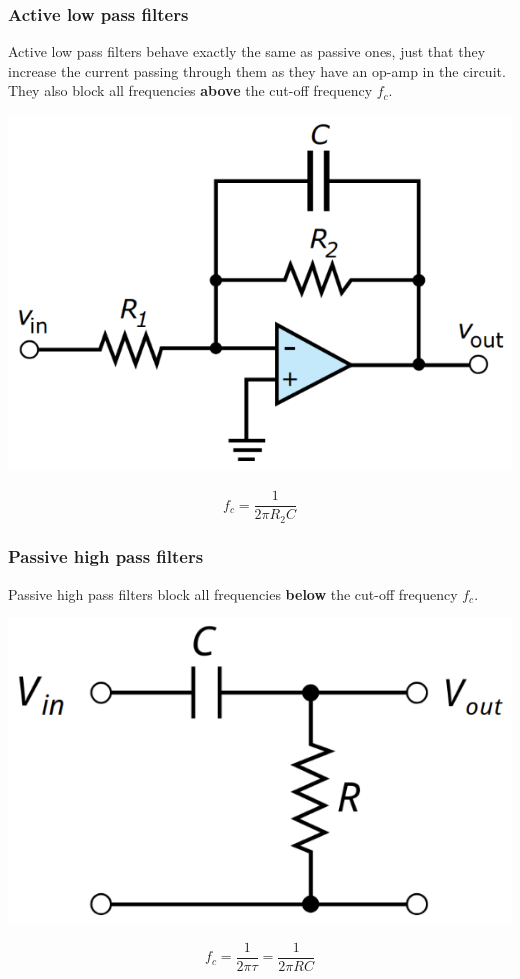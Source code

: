 \documentclass[11pt]{article}
\begin{document}
 \newpage
\subsubsection{Active low pass filters}
\label{sec:orgfe1a258}
Active low pass filters behave exactly the same as passive ones, just that they increase the current passing through them as they have an op-amp in the circuit. They also block all frequencies \textbf{above} the cut-off frequency \(f_c\).
\begin{center}
\includegraphics[width=.9\linewidth]{./images/active-low-pass-filter.png}
\end{center}
\[f_c = \frac{1}{2 \pi R_2 C}\]

 \newpage
\subsubsection{Passive high pass filters}
\label{sec:orgd8f3a6f}
Passive high pass filters block all frequencies \textbf{below} the cut-off frequency \(f_c\).
\begin{center}
\includegraphics[width=.9\linewidth]{./images/passive-high-pass-filter.png}
\end{center}
\[f_c = \frac{1}{2 \pi \tau} = \frac{1}{2 \pi RC}\]
\end{document}
